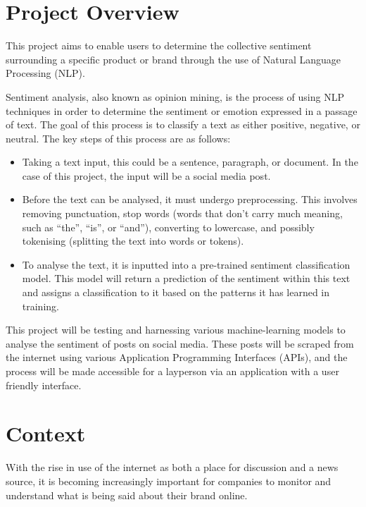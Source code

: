 \section{Project Overview}
This project aims to enable users to determine the collective sentiment surrounding a specific product or brand through the use of Natural Language Processing (NLP).

Sentiment analysis, also known as opinion mining, is the process of using NLP techniques in order to determine the sentiment or emotion expressed in a passage of text. The goal of this process is to classify a text as either positive, negative, or neutral. The key steps of this process are as follows:
\begin{itemize}
    \item Taking a text input, this could be a sentence, paragraph, or document. In the case of this project, the input will be a social media post.
    \item Before the text can be analysed, it must undergo preprocessing. This involves removing punctuation, stop words (words that don't carry much meaning, such as ``the'', ``is'', or ``and''), converting to lowercase, and possibly tokenising (splitting the text into words or tokens).
    \item To analyse the text, it is inputted into a pre-trained sentiment classification model. This model will return a prediction of the sentiment within this text and assigns a classification to it based on the patterns it has learned in training.
\end{itemize}

This project will be testing and harnessing various machine-learning models to analyse the sentiment of posts on social media. These posts will be scraped from the internet using various Application Programming Interfaces (APIs), and the process will be made accessible for a layperson via an application with a user friendly interface.

\section{Context}
With the rise in use of the internet as both a place for discussion and a news source, it is becoming increasingly important for companies to monitor and understand what is being said about their brand online.

